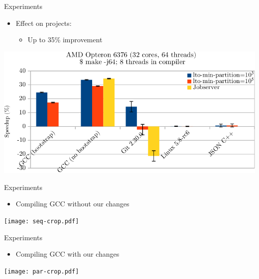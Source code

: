 \begin{frame}[fragile]{Experiments}
\begin{itemize}
    \item Effect on projects:
    \begin{itemize}
        \item Up to 35\% improvement
    \end{itemize}

\end{itemize}
\begin{center}
\includegraphics[scale=0.7]{figuras/experiment_projects_new-crop.pdf}
\end{center}
\end{frame}


\begin{frame}{Experiments}
\begin{itemize}
    \item Compiling GCC without our changes
\end{itemize}
\begin{center}
\texttt{[image: seq-crop.pdf]}
\end{center}
\end{frame}


\begin{frame}[fragile]{Experiments}
\begin{itemize}
    \item Compiling GCC with our changes
\end{itemize}
\begin{center}
\texttt{[image: par-crop.pdf]}
\end{center}
\end{frame}

